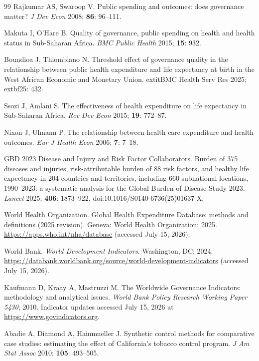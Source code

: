 \documentclass[12pt,a4paper]{article}
\begin{document}
\begin{thebibliography}{99}
 Rajkumar AS, Swaroop V. Public spending and outcomes: does
governance matter? \textit{J Dev Econ} 2008; \textbf{86}: 96--111.

 Makuta I, O'Hare B. Quality of governance, public spending on
health and health status in Sub-Saharan Africa. \textit{BMC Public Health}
2015; \textbf{15}: 932.

 Boundioa J, Thiombiano N. Threshold effect of governance quality in the relationship between public health expenditure and life expectancy at birth in the West African Economic and Monetary Union. 	extit{BMC Health Serv Res} 2025; 	extbf{25}: 432.

 Ssozi J, Amlani S. The effectiveness of health expenditure on
life expectancy in Sub-Saharan Africa. \textit{Rev Dev Econ} 2015; \textbf{19}:
772--87.

 Nixon J, Ulmann P. The relationship between health care
expenditure and health outcomes. \textit{Eur J Health Econ} 2006; \textbf{7}:
7--18.

 GBD 2023 Disease and Injury and Risk Factor Collaborators. Burden of
375 diseases and injuries, risk-attributable burden of 88 risk factors, and
healthy life expectancy in 204 countries and territories, including 660
subnational locations, 1990--2023: a systematic analysis for the Global Burden
of Disease Study 2023. \textit{Lancet} 2025; \textbf{406}: 1873--922.
doi:10.1016/S0140-6736(25)01637-X.

 World Health Organization. Global Health Expenditure Database: methods and definitions (2025 revision). Geneva: World Health Organization; 2025. \url{https://apps.who.int/nha/database} (accessed July 15, 2026).


 World Bank. \textit{World Development Indicators}. Washington,
DC; 2024. \url{https://databank.worldbank.org/source/world-development-indicators} (accessed July 15, 2026).

 Kaufmann D, Kraay A, Mastruzzi M. The Worldwide Governance
Indicators: methodology and analytical issues. \textit{World Bank Policy
Research Working Paper 5430}; 2010. Indicator updates accessed July 15, 2026
at \url{https://www.govindicators.org}.

 Abadie A, Diamond A, Hainmueller J. Synthetic control methods for
comparative case studies: estimating the effect of California's tobacco control
program. \textit{J Am Stat Assoc} 2010; \textbf{105}: 493--505.


\end{thebibliography}
\end{document}

